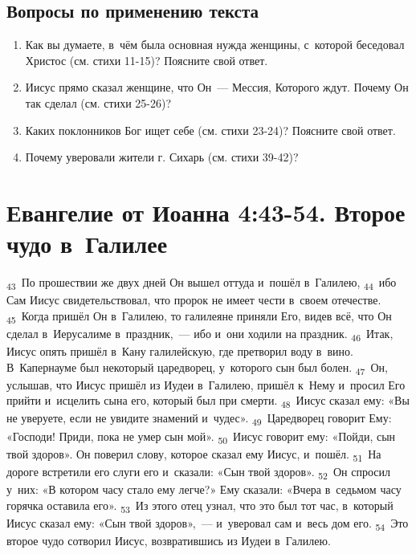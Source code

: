 \documentclass[a4paper,12pt]{article}
\begin{document}
\subsection*{Вопросы по применению текста} 
\begin{enumerate}
    \item Как вы думаете, в~чём была основная нужда женщины, с~которой беседовал Христос (см. стихи 11-15)? Поясните свой ответ. 
    
    \myline
    
    \myline
    \item Иисус прямо сказал женщине, что Он~--- Мессия, Которого ждут. Почему Он так сделал (см. стихи 25-26)? 
    
    \myline
    
    \myline
    \item Каких поклонников Бог ищет себе (см. стихи 23-24)? Поясните свой ответ. 
    
    \myline
    
    \myline
    \item Почему уверовали жители г. Сихарь (см. стихи 39-42)? 
    
    \myline
    
    \myline
\end{enumerate}



\section{Евангелие от Иоанна 4:43-54. Второе чудо в~Галилее}

 \textsubscript{43}~По прошествии же двух дней Он вышел оттуда и~пошёл в~Галилею, \textsubscript{44}~ибо Сам Иисус свидетельствовал, что пророк не имеет чести в~своем отечестве. \textsubscript{45}~Когда пришёл Он в~Галилею, то галилеяне приняли Его, видев всё, что Он сделал в~Иерусалиме в~праздник,~--- ибо и~они ходили на праздник. \textsubscript{46}~Итак, Иисус опять пришёл в~Кану галилейскую, где претворил воду в~вино. В~Капернауме был некоторый царедворец, у~которого сын был болен. \textsubscript{47}~Он, услышав, что Иисус пришёл из Иудеи в~Галилею, пришёл к~Нему и~просил Его прийти и~исцелить сына его, который был при смерти. \textsubscript{48}~Иисус сказал ему: «Вы не уверуете, если не увидите знамений и~чудес». \textsubscript{49}~Царедворец говорит Ему: «Господи! Приди, пока не умер сын мой». \textsubscript{50}~Иисус говорит ему: «Пойди, сын твой здоров». Он поверил слову, которое сказал ему Иисус, и~пошёл. \textsubscript{51}~На дороге встретили его слуги его и~сказали: «Сын твой здоров». \textsubscript{52}~Он спросил у~них: «В котором часу стало ему легче?» Ему сказали: «Вчера в~седьмом часу горячка оставила его». \textsubscript{53}~Из этого отец узнал, что это был тот час, в~который Иисус сказал ему: «Сын твой здоров»,~--- и~уверовал сам и~весь дом его. \textsubscript{54}~Это второе чудо сотворил Иисус, возвратившись из Иудеи в~Галилею. 
\end{document}
